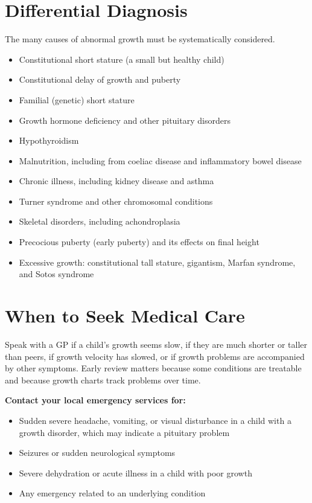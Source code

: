 \section*{Differential Diagnosis}
The many causes of abnormal growth must be systematically considered.

\begin{itemize}
    \item Constitutional short stature (a small but healthy child)
    \item Constitutional delay of growth and puberty
    \item Familial (genetic) short stature
    \item Growth hormone deficiency and other pituitary disorders
    \item Hypothyroidism
    \item Malnutrition, including from coeliac disease and inflammatory bowel disease
    \item Chronic illness, including kidney disease and asthma
    \item Turner syndrome and other chromosomal conditions
    \item Skeletal disorders, including achondroplasia
    \item Precocious puberty (early puberty) and its effects on final height
    \item Excessive growth: constitutional tall stature, gigantism, Marfan syndrome, and Sotos syndrome
\end{itemize}

\section*{When to Seek Medical Care}
Speak with a GP if a child's growth seems slow, if they are much shorter or taller than peers, if growth velocity has slowed, or if growth problems are accompanied by other symptoms. Early review matters because some conditions are treatable and because growth charts track problems over time.

\textbf{Contact your local emergency services for:}
\begin{itemize}
    \item Sudden severe headache, vomiting, or visual disturbance in a child with a growth disorder, which may indicate a pituitary problem
    \item Seizures or sudden neurological symptoms
    \item Severe dehydration or acute illness in a child with poor growth
    \item Any emergency related to an underlying condition
\end{itemize}

